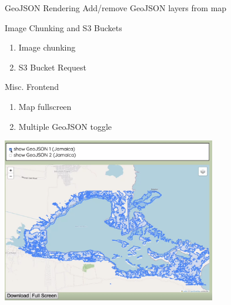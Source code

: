 \begin{frame}{GeoJSON Rendering}
    Add/remove GeoJSON layers from map
\end{frame}

\begin{frame}{Image Chunking and S3 Buckets}
    \begin{enumerate}
        \item Image chunking
        \item S3 Bucket Request
    \end{enumerate}
\end{frame}

\begin{frame}{Misc. Frontend}
    \begin{enumerate}
        \item Map fullscreen
        \item Multiple GeoJSON toggle
    \end{enumerate}
    \includegraphics[height=0.7\textheight,width=0.7\textwidth,keepaspectratio]{mm_1-24_fullscreen.png}
\end{frame}